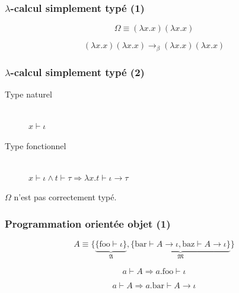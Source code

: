 \documentclass[14pt,utf8x,hyperref={pdfpagelabels=false}]{beamer}
\begin{document}
\begin{slideDecision}
  \begin{changeleftmargin}{1.1cm}
    \frametitle{$\lambda$-calcul simplement typé (1)}

    \begin{equation*}
      \Omega \equiv (\lambda x . x) (\lambda x . x)
    \end{equation*}

    \begin{equation*}
      (\lambda x . x) (\lambda x . x) \rightarrow_\beta
      (\lambda x . x) (\lambda x . x)
    \end{equation*}
  \end{changeleftmargin}
\end{slideDecision}

\begin{slideDecision}
  \begin{changeleftmargin}{1.1cm}
    \frametitle{$\lambda$-calcul simplement typé (2)}

    \begin{description}
    \item[Type naturel]~\\
      $x \vdash \iota$
    \item[Type fonctionnel]~\\
      $x \vdash \iota \wedge t \vdash \tau \Rightarrow \lambda x. t \vdash \iota \rightarrow \tau$
    \end{description}

    \bigskip

    $\Omega$ n'est pas correctement typé.

  \end{changeleftmargin}
\end{slideDecision}

\begin{slideDecision}
  \begin{changeleftmargin}{1.1cm}
    \frametitle{Programmation orientée objet (1)}

    \begin{equation*}
      A \equiv \{ \underbrace{\{ \text{foo} \vdash \iota
        \}}_{\mathfrak{A}}, \underbrace{\{ \text{bar} \vdash A
        \rightarrow \iota, \text{baz} \vdash A \rightarrow \iota
        \}}_{\mathfrak{M}} \}
    \end{equation*}

    \begin{equation*}
      a \vdash A \Rightarrow a.\text{foo} \vdash \iota
    \end{equation*}

    \begin{equation*}
      a \vdash A \Rightarrow a.\text{bar} \vdash A \rightarrow \iota
    \end{equation*}
  \end{changeleftmargin}
\end{slideDecision}
\end{document}
